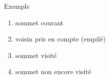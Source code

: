 \documentclass[10pt]{beamer}
\begin{document}
\begin{frame}{Exemple}
\begin{enumerate}[--]
	\item \color{graphrouge} sommet courant
    \item \color{graphviolet} voisin pris en compte (empilé)
    \item \color{graphbleu} sommet visité
    \item \color{graphautre} sommet non encore visité
\end{enumerate}


\end{frame}
\end{document}
